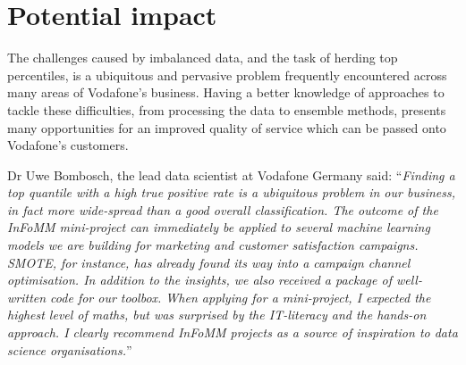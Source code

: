 \documentclass[english,a4paper,oneside,9pt]{extarticle}
\begin{document}
\section{Potential impact}

The challenges caused by imbalanced data, and the task of herding top percentiles, is a ubiquitous and pervasive problem frequently encountered across many areas of Vodafone's business. Having a better knowledge of approaches to tackle these difficulties, from processing the data to ensemble methods, presents many opportunities for an improved quality of service which can be passed onto Vodafone's customers. 

Dr Uwe Bombosch, the lead data scientist at Vodafone Germany said:
``\emph{Finding a top quantile with a high true positive rate is a ubiquitous problem in our business, in fact more wide-spread than a good overall classification. The outcome of the InFoMM mini-project can immediately be applied to several machine learning models we are building for marketing and customer satisfaction campaigns. SMOTE, for instance, has already found its way into a campaign channel optimisation. In addition to the insights, we also received a package of well-written code for our toolbox. When applying for a mini-project, I expected the highest level of maths, but was surprised by the IT-literacy and the hands-on approach. I clearly recommend InFoMM projects as a source of inspiration to data science organisations.}''


\clearpage
\end{document}
